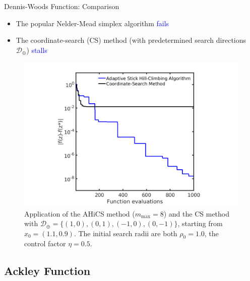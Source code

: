 \documentclass{beamer}
\begin{document}
\begin{frame}{Dennis-Woods Function: Comparison}
\begin{itemize}
	\item The popular Nelder-Mead simplex algorithm \textcolor{blue}{fails}
	\item The coordinate-search (CS) method (with predetermined search
		directions $\mathcal{D}_\oplus$) \textcolor{blue}{stalls}
\end{itemize}
\begin{figure}[!htbp]
	\centering
	  \includegraphics[scale=0.17]{./figures/dwoods_cmp.png}
	  \caption{
	  \footnotesize{
	  Application of the AHiCS method
	  ($m_{\max}=8$) and the CS method with
	  $\mathcal{D}_{\oplus}=\{(1,0), (0,1), (-1,0), (0,-1)\}$,
	  starting from $x_0=(1.1, 0.9)$.
	  The initial search radii are both $\rho_0 = 1.0$,
	  the control factor $\eta=0.5$.}
	  }
\label{fig:dwfun:cmp}
\end{figure}
\end{frame}

\subsection{Ackley Function}
\end{document}
